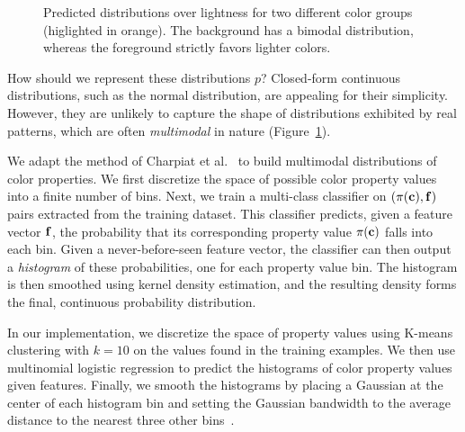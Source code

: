 \begin{figure}[ht]
\caption{Predicted distributions over lightness for two different color groups (higlighted in orange). The background has a bimodal distribution, whereas the foreground strictly favors lighter colors.}
\label{fig:unaryHistograms}
\vspace{-1.0em}
\end{figure}

How should we represent these distributions $p$? Closed-form continuous distributions, such as the normal distribution, are appealing for their simplicity.  However, they are unlikely to capture the shape of distributions exhibited by real patterns, which are often \emph{multimodal} in nature (Figure~\ref{fig:unaryHistograms}).

We adapt the method of Charpiat et al.~ to build multimodal distributions of color properties. We first discretize the space of possible color property values into a finite number of bins. Next, we train a multi-class classifier on $(\pi(\mathbf{c}), \mathbf{f})$ pairs extracted from the training dataset. This classifier predicts, given a feature vector $\mathbf{f}$, the probability that its corresponding property value $\pi(\mathbf{c})$ falls into each bin. Given a never-before-seen feature vector, the classifier can then output a \emph{histogram} of these probabilities, one for each property value bin. The histogram is then smoothed using kernel density estimation, and the resulting density forms the final, continuous probability distribution.

In our implementation, we discretize the space of property values using K-means clustering with $k = 10$ on the values found in the training examples. We then use multinomial logistic regression to predict the histograms of color property values given features.
Finally, we smooth the histograms by placing a Gaussian at the center of each histogram bin and setting the Gaussian bandwidth to the average distance to the nearest three other bins~\cite{ThemeEnhancement}.